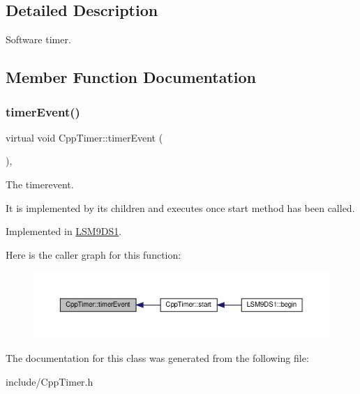 \subsection{Detailed Description}
Software timer. 

\subsection{Member Function Documentation}
\mbox{\label{classCppTimer_ac2665403595b6aee5f581d0ebfeb886c}} 
\subsubsection{\texorpdfstring{timer\+Event()}{timerEvent()}}
{\footnotesize\ttfamily virtual void Cpp\+Timer\+::timer\+Event (\begin{DoxyParamCaption}{ }\end{DoxyParamCaption})\hspace{0.3cm}{\ttfamily [protected]}, {}}



The timerevent. 

It is implemented by its children and executes once start method has been called. 

Implemented in \hyperlink{classLSM9DS1_ad1fffc2bc5987339430d3b293da0bdd1}{L\+S\+M9\+D\+S1}.

Here is the caller graph for this function\+:
\nopagebreak
\begin{figure}[H]
\begin{center}
\leavevmode
\includegraphics[width=350pt]{classCppTimer_ac2665403595b6aee5f581d0ebfeb886c_icgraph}
\end{center}
\end{figure}


The documentation for this class was generated from the following file\+:\begin{DoxyCompactItemize}
\item 
include/Cpp\+Timer.\+h\end{DoxyCompactItemize}
